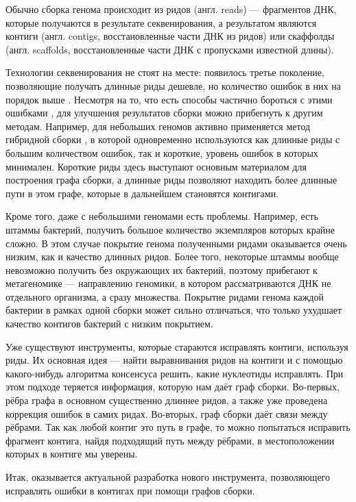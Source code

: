 \documentclass[14pt]{matmex-diploma-custom}
\begin{document}
Обычно сборка генома происходит из ридов (англ. reads) --- фрагментов ДНК, которые получаются в результате секвенирования, а результатом являются контиги (англ. contigs, восстановленные части ДНК из ридов) или скаффолды (англ. scaffolds, восстановленные части ДНК с пропусками известной длины).

Технологии секвенирования не стоят на месте: появилось третье поколение, позволяющие получать длинные риды дешевле, но количество ошибок в них на порядок выше \cite{art:reads}. Несмотря на то, что есть способы частично бороться с этими ошибками \cite{art:alic2016objective}, для улучшения результатов сборки можно прибегнуть к другим методам. Например, для небольших геномов активно применяется метод гибридной сборки \cite{art:hybridSpades, art:zimin2013masurca, art:wick2017unicycler}, в которой одновременно используются как длинные риды с большим количеством ошибок, так и короткие, уровень ошибок в которых минимален. Короткие риды здесь выступают основным материалом для построения графа сборки, а длинные риды позволяют находить более длинные пути в этом графе, которые в дальнейшем становятся контигами.

Кроме того, даже с небольшими геномами есть проблемы. Например, есть штаммы бактерий, получить большое количество экземпляров которых крайне сложно. В этом случае покрытие генома полученными ридами оказывается очень низким, как и качество длинных ридов. Более того, некоторые штаммы вообще невозможно получить без окружающих их бактерий, поэтому прибегают к метагеномике --- направлению геномики, в котором рассматриваются ДНК не отдельного организма, а сразу множества. Покрытие ридами генома каждой бактерии в рамках одной сборки может сильно отличаться, что только ухудшает качество контигов бактерий с низким покрытием.

Уже существуют инструменты, которые стараются исправлять контиги, используя риды. Их основная идея --- найти выравнивания ридов на контиги и с помощью какого-нибудь алгоритма консенсуса решить, какие нуклеотиды исправлять. При этом подходе теряется информация, которую нам даёт граф сборки. Во-первых, рёбра графа в основном существенно длиннее ридов, а также уже проведена коррекция ошибок в самих ридах. Во-вторых, граф сборки даёт связи между рёбрами. Так как любой контиг это путь в графе, то можно попытаться исправить фрагмент контига, найдя подходящий путь между рёбрами, в местоположении которых в контиге мы уверены.

Итак, оказывается актуальной разработка нового инструмента, позволяющего исправлять ошибки в контигах при помощи графов сборки.
\end{document}
